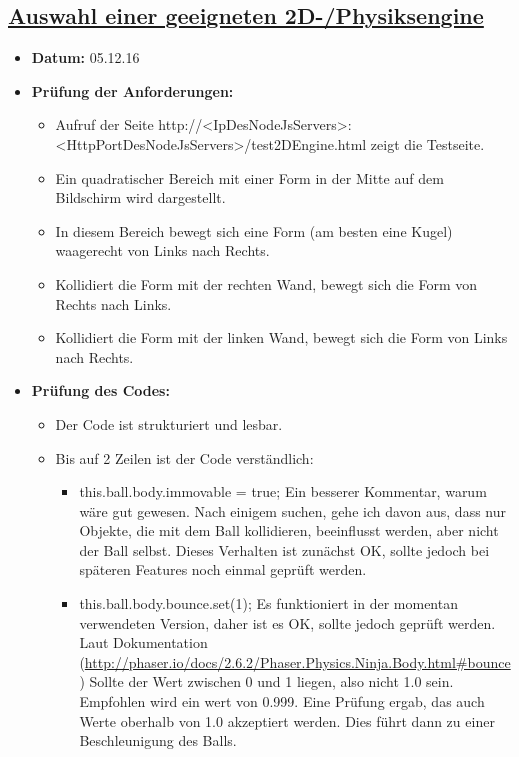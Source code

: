\subsection{\href{https://github.com/Transport-Protocol/MBC-Ping-Pong/issues/3}{Auswahl einer geeigneten 2D-/Physiksengine}}
\begin{itemize}
	\item \textbf{Datum:} 05.12.16
	\item \textbf{Prüfung der Anforderungen:}
	\begin{itemize}
		\item \checkmark Aufruf der Seite http://<IpDesNodeJsServers>:<HttpPortDesNodeJsServers>/test2DEngine.html zeigt die Testseite.
		\item \checkmark Ein quadratischer Bereich mit einer Form in der Mitte auf dem Bildschirm wird dargestellt.
		\item \checkmark In diesem Bereich bewegt sich eine Form (am besten eine Kugel) waagerecht von Links nach Rechts.
		\item \checkmark Kollidiert die Form mit der rechten Wand, bewegt sich die Form von Rechts nach Links.
		\item \checkmark Kollidiert die Form mit der linken Wand, bewegt sich die Form von Links nach Rechts.
	\end{itemize}
	\item \textbf{Prüfung des Codes:}
	\begin{itemize}
		\item Der Code ist strukturiert und lesbar.
		\item Bis auf 2 Zeilen ist der Code verständlich:
		\begin{itemize}
			\item this.ball.body.immovable = true; \newline
			Ein besserer Kommentar, warum wäre gut gewesen. Nach einigem suchen, gehe ich davon aus, dass nur Objekte, die mit dem Ball kollidieren, beeinflusst werden, aber nicht der Ball selbst.\newline
			Dieses Verhalten ist zunächst OK, sollte jedoch bei späteren Features noch einmal geprüft werden.
			\item this.ball.body.bounce.set(1); \newline
			Es funktioniert in der momentan verwendeten Version, daher ist es OK, sollte jedoch geprüft werden. Laut Dokumentation (\href{http://phaser.io/docs/2.6.2/Phaser.Physics.Ninja.Body.html\#bounce}{http://phaser.io/docs/2.6.2/Phaser.Physics.Ninja.Body.html\#bounce}) Sollte der Wert zwischen 0 und 1 liegen, also nicht 1.0 sein. Empfohlen wird ein wert von 0.999. Eine Prüfung ergab, das auch Werte oberhalb von 1.0 akzeptiert werden. Dies führt dann zu einer Beschleunigung des Balls.
		\end{itemize}
	\end{itemize}
\end{itemize}

